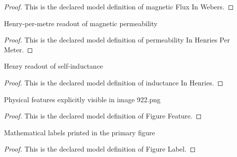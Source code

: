 \begin{proof}
  This is the declared model definition of magnetic Flux In Webers.
\end{proof}
\begin{definition}
  \label{def:physics:phyx-mini-0922:phyxminiproblems-problemphyxmini0922-permeabilityinhenriespermeter}
  Henry-per-metre readout of magnetic permeability
\end{definition}
\begin{proof}
  This is the declared model definition of permeability In Henries Per Meter.
\end{proof}
\begin{definition}
  \label{def:physics:phyx-mini-0922:phyxminiproblems-problemphyxmini0922-inductanceinhenries}
  Henry readout of self-inductance
\end{definition}
\begin{proof}
  This is the declared model definition of inductance In Henries.
\end{proof}
\begin{definition}
  \label{def:physics:phyx-mini-0922:phyxminiproblems-problemphyxmini0922-figurefeature}
  Physical features explicitly visible in image 922.png
\end{definition}
\begin{proof}
  This is the declared model definition of Figure Feature.
\end{proof}
\begin{definition}
  \label{def:physics:phyx-mini-0922:phyxminiproblems-problemphyxmini0922-figurelabel}
  Mathematical labels printed in the primary figure
\end{definition}
\begin{proof}
  This is the declared model definition of Figure Label.
\end{proof}
